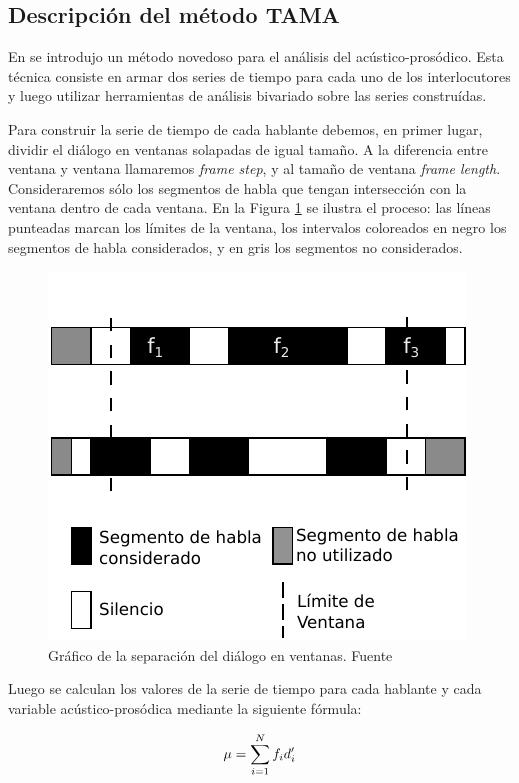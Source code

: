 \subsection{Descripción del método TAMA}
\label{sec:ant_tama}

En \cite{KOU2008} se introdujo un método novedoso para el análisis del \entrainment acústico-prosódico. Esta técnica consiste en armar dos series de tiempo para cada uno de los interlocutores y luego utilizar herramientas de análisis bivariado sobre las series construídas. 

Para construir la serie de tiempo de cada hablante debemos, en primer lugar, dividir el diálogo en ventanas solapadas de igual tamaño. A la diferencia entre ventana y ventana llamaremos \emph{frame step}, y al tamaño de ventana \emph{frame length}. Consideraremos sólo los segmentos de habla que tengan intersección con la ventana dentro de cada ventana. En la Figura \ref{tama} se ilustra el proceso: las líneas punteadas marcan los límites de la ventana, los intervalos coloreados en negro los segmentos de habla considerados, y en gris los segmentos no considerados.

\begin{figure}[t]
\centering
  \includegraphics[scale=0.85]{images/tama_improved.pdf}
\caption{Gráfico de la separación del diálogo en ventanas. Fuente \cite{KOU2008.2}}
\label{tama}
\end{figure}

Luego se calculan los valores de la serie de tiempo para cada hablante y cada variable acústico-prosódica mediante la siguiente fórmula:

\begin{equation}
    \mu = \sum\limits_{i=1}^N f_i d_i^\prime \label{eq:tama_mean}\\
\end{equation}

